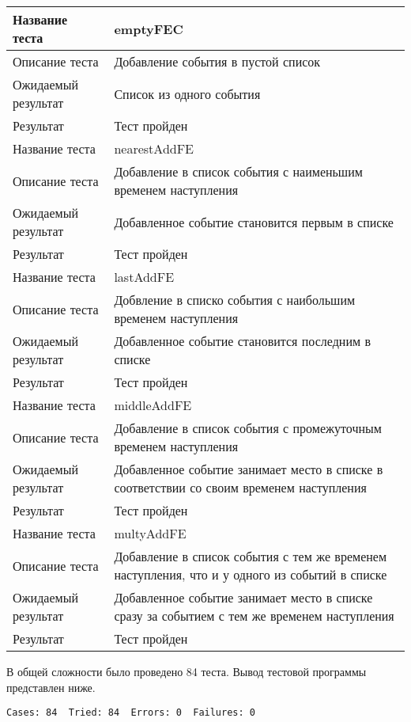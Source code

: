 \begin{table}[h!]
\caption{}
\label{tab:chainsTest}
\begin{tabular}{|l|p{}|}
\hline
Название теста & emptyFEC\\
\hline
Описание теста & Добавление события в пустой список\\
\hline
Ожидаемый результат & Список из одного события\\
\hline
Результат & Тест пройден\\
\hline
\hline
Название теста & nearestAddFE\\
\hline
Описание теста & Добавление в список события с наименьшим временем наступления\\
\hline
Ожидаемый результат & Добавленное событие становится первым в списке\\
\hline
Результат & Тест пройден\\
\hline
\hline
Название теста & lastAddFE\\
\hline
Описание теста & Добвление в списко события с наибольшим временем наступления\\
\hline
Ожидаемый результат & Добавленное событие становится последним в списке\\
\hline
Результат & Тест пройден\\
\hline
\hline
Название теста & middleAddFE\\
\hline
Описание теста & Добавление в список события с промежуточным временем наступления\\
\hline
Ожидаемый результат & Добавленное событие занимает место в списке в соответствии со своим временем наступления\\
\hline
Результат & Тест пройден\\
\hline
\hline
Название теста & multyAddFE\\
\hline
Описание теста & Добавление в список события с тем же  временем наступления, что и у  одного из событий в списке\\
\hline
Ожидаемый результат & Добавленное событие занимает место в списке сразу за событием с тем же временем наступления\\
\hline
Результат & Тест пройден \\
\hline
\end{tabular}
\end{table}

В общей сложности было проведено 84 теста. Вывод тестовой программы представлен ниже.

\begin{verbatim}
Cases: 84  Tried: 84  Errors: 0  Failures: 0
\end{verbatim}


